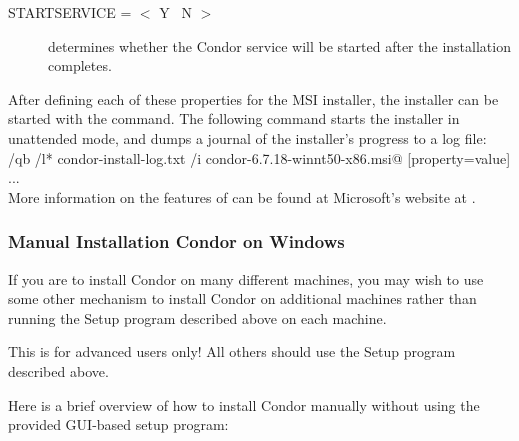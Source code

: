 \begin{description}
\item [STARTSERVICE = $<$ Y \Bar\ N $>$]
determines whether the Condor service will be started after the installation
completes.
\end {description}

After defining each of these properties for the MSI installer, the
installer can be started with the \verb@msiexec@ command. The following
command starts the installer in unattended mode, and dumps a journal of
the installer's progress to a log file:\\
\verb@msiexec /qb /l* condor-install-log.txt /i condor-6.7.18-winnt50-x86.msi@ [property=value] ... \\

More information on the features of \verb@msiexec@
can be found at Microsoft's website at
.

\subsubsection{\label{sec:NT-Manual-Install}Manual Installation Condor on Windows}

If you are to install Condor on many different machines, you may wish
to use some other mechanism to install Condor on additional machines
rather than running the Setup program described above on each machine.

\Warn This is for advanced users only!  All others should use the Setup program described above. 

Here is a brief overview of how to install Condor manually without using the provided GUI-based setup program:

